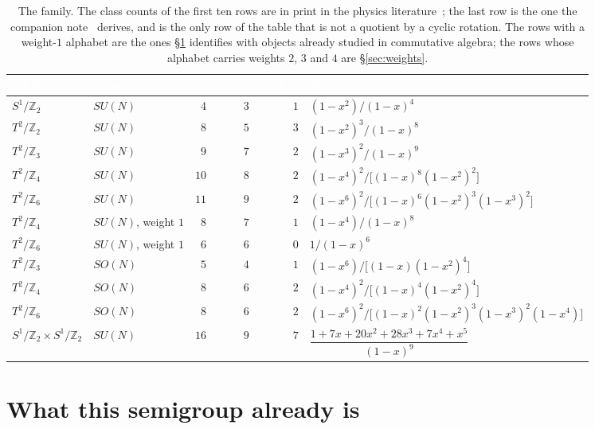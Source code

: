 \documentclass[11pt,a4paper]{article}
\theoremstyle{definition}
\newcommand{\ZZ}{\mathbb{Z}}
\newcommand{\su}[1]{SU(#1)}
\newcommand{\so}[1]{SO(#1)}
\begin{document}
\begin{table}[h]
\centering\footnotesize
\begin{tabular}{llrrrl}
\toprule
\rowcolor{hdrblue}
\textcolor{white}{orbifold} & \textcolor{white}{group} & \textcolor{white}{$n$} &
\textcolor{white}{$\dim S$} & \textcolor{white}{rank $\mathcal L$} &
\textcolor{white}{$H(S,x)$}\\
\midrule
$S^1/\ZZ_2$ & $\su N$ & $4$ & $3$ & $1$ & $(1-x^2)/(1-x)^4$\\
\rowcolor{softgrey}
$T^2/\ZZ_2$ & $\su N$ & $8$ & $5$ & $3$ & $(1-x^2)^3/(1-x)^8$\\
$T^2/\ZZ_3$ & $\su N$ & $9$ & $7$ & $2$ & $(1-x^3)^2/(1-x)^9$\\
\rowcolor{softgrey}
$T^2/\ZZ_4$ & $\su N$ & $10$ & $8$ & $2$ & $(1-x^4)^2/\big[(1-x)^8(1-x^2)^2\big]$\\
$T^2/\ZZ_6$ & $\su N$ & $11$ & $9$ & $2$ &
$(1-x^6)^2/\big[(1-x)^6(1-x^2)^3(1-x^3)^2\big]$\\
\rowcolor{softgrey}
$T^2/\ZZ_4$ & $\su N$, weight $1$ & $8$ & $7$ & $1$ & $(1-x^4)/(1-x)^8$\\
$T^2/\ZZ_6$ & $\su N$, weight $1$ & $6$ & $6$ & $0$ & $1/(1-x)^6$\\
\rowcolor{softgrey}
$T^2/\ZZ_3$ & $\so N$ & $5$ & $4$ & $1$ & $(1-x^6)/\big[(1-x)(1-x^2)^4\big]$\\
$T^2/\ZZ_4$ & $\so N$ & $8$ & $6$ & $2$ & $(1-x^4)^2/\big[(1-x)^4(1-x^2)^4\big]$\\
\rowcolor{softgrey}
$T^2/\ZZ_6$ & $\so N$ & $8$ & $6$ & $2$ &
$(1-x^6)^2/\big[(1-x)^2(1-x^2)^3(1-x^3)^2(1-x^4)\big]$\\
\midrule
$S^1/\ZZ_2\times S^1/\ZZ_2$ & $\su N$ & $16$ & $9$ & $7$ &
$\dfrac{1+7x+20x^2+28x^3+7x^4+x^5}{(1-x)^9}$\\
\bottomrule
\end{tabular}
\caption{The family. The class counts of the first ten rows are in print in the physics
literature~\cite{HHK,KM,TI2,TI3}; the last row is the one the companion note~\cite{IXA} derives,
and is the only row of the table that is not a quotient by a cyclic rotation. The rows with a weight-$1$
alphabet are the ones \S\ref{sec:dictionary} identifies with objects already studied in
commutative algebra; the rows whose alphabet carries weights $2$, $3$ and $4$ are
\S\ref{sec:weights}.}
\label{tab:family}
\end{table}

\section{What this semigroup already is}\label{sec:dictionary}
\end{document}
